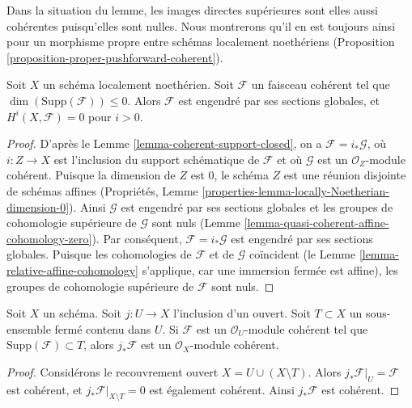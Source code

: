 \noindent
Dans la situation du lemme, les images directes supérieures sont elles aussi
cohérentes puisqu'elles sont nulles.
Nous montrerons qu'il en est toujours ainsi pour un morphisme propre
entre schémas localement noethériens
(Proposition \ref{proposition-proper-pushforward-coherent}).

\begin{lemma}
\label{lemma-coherent-support-dimension-0}
Soit $X$ un schéma localement noethérien. Soit $\mathcal{F}$
un faisceau cohérent tel que $\dim(\text{Supp}(\mathcal{F})) \leq 0$.
Alors $\mathcal{F}$ est engendré par ses sections globales, et
$H^i(X, \mathcal{F}) = 0$ pour $i > 0$.
\end{lemma}

\begin{proof}
D'après le Lemme \ref{lemma-coherent-support-closed}, on a
$\mathcal{F} = i_*\mathcal{G}$, où $i : Z \to X$ est l'inclusion
du support schématique de $\mathcal{F}$ et où $\mathcal{G}$
est un $\mathcal{O}_Z$-module cohérent. Puisque la dimension de $Z$ est
$0$, le schéma $Z$ est une réunion disjointe de schémas affines (Propriétés, Lemme
\ref{properties-lemma-locally-Noetherian-dimension-0}).
Ainsi $\mathcal{G}$ est engendré par ses sections globales et les groupes de
cohomologie supérieure de $\mathcal{G}$ sont nuls
(Lemme \ref{lemma-quasi-coherent-affine-cohomology-zero}).
Par conséquent, $\mathcal{F} = i_*\mathcal{G}$ est engendré par ses sections globales.
Puisque les cohomologies de $\mathcal{F}$ et de $\mathcal{G}$ coïncident
(le Lemme \ref{lemma-relative-affine-cohomology} s'applique, car une
immersion fermée est affine),
les groupes de cohomologie supérieure de $\mathcal{F}$ sont nuls.
\end{proof}

\begin{lemma}
\label{lemma-pushforward-coherent-on-open}
Soit $X$ un schéma. Soit $j : U \to X$ l'inclusion d'un ouvert.
Soit $T \subset X$ un sous-ensemble fermé contenu dans $U$.
Si $\mathcal{F}$ est un $\mathcal{O}_U$-module cohérent
tel que $\text{Supp}(\mathcal{F}) \subset T$, alors
$j_*\mathcal{F}$ est un $\mathcal{O}_X$-module cohérent.
\end{lemma}

\begin{proof}
Considérons le recouvrement ouvert $X = U \cup (X \setminus T)$.
Alors $j_*\mathcal{F}|_U = \mathcal{F}$ est cohérent, et
$j_*\mathcal{F}|_{X \setminus T} = 0$ est également cohérent.
Ainsi $j_*\mathcal{F}$ est cohérent.
\end{proof}














